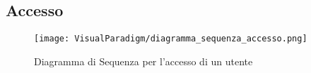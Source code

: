 \subsection{Accesso}
\label{sec:sequenza_accesso}
\begin{figure}[H]
  \centering
  \texttt{[image: VisualParadigm/diagramma\_sequenza\_accesso.png]}
  \caption{Diagramma di Sequenza per l'accesso di un utente}
  \label{fig:sequenza_accesso}
\end{figure}
\clearpage
